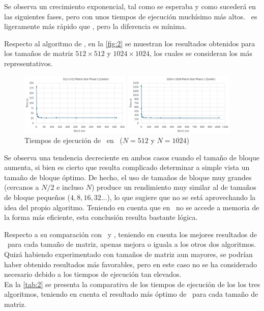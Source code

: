 Se observa un crecimiento exponencial, tal como se esperaba y como sucederá en las siguientes fases, pero con unos tiempos de ejecución 
muchísimo más altos. \colmajor\ es ligeramente más rápido que \rowmajor, pero la diferencia es mínima. 

\newpage

Respecto al algoritmo de \zorder, en la \autoref{fig:2} se muestran los resultados obtenidos para los tamaños de matriz $512 \times 512$ y $1024 \times 1024$, los 
cuales se consideran los más representativos.

\begin{figure}[h]
    \centering
    \includegraphics[width=0.95\textwidth]{img/2.png}
    \caption{Tiempos de ejecución de \zorder\ en \python\ ($N = 512$ y $N = 1024$)}
    \label{fig:2}
\end{figure}

Se observa una tendencia decreciente en ambos casos cuando el tamaño de bloque aumenta, si bien es cierto que resulta complicado determinar a simple vista un 
tamaño de bloque óptimo. De hecho, el uso de tamaños de bloque muy grandes (cercanos a $N/2$ e incluso $N$) produce un rendimiento muy similar al de 
tamaños de bloque pequeños ($4, 8, 16, 32 ...$), lo que sugiere que no se está aprovechando la idea del propio algoritmo. Teniendo en cuenta 
que en \python\ no se accede a memoria de la forma más eficiente, esta conclusión resulta bastante lógica.


Respecto a su comparación con \rowmajor\ y \colmajor, teniendo en cuenta los mejores resultados de \zorder\ para cada tamaño de matriz,
apenas mejora o iguala a los otros dos algoritmos. Quizá habiendo experimentado con tamaños de matriz aun mayores, se podrían haber 
obtenido resultados más favorables, pero en este caso no se ha considerado necesario debido a los tiempos de ejecución tan elevados. \\
En la \autoref{tab:2} se presenta la comparativa de los tiempos de ejecución de los los tres algoritmos, teniendo en cuenta el resultado más
óptimo de \zorder\ para cada tamaño de matriz.

